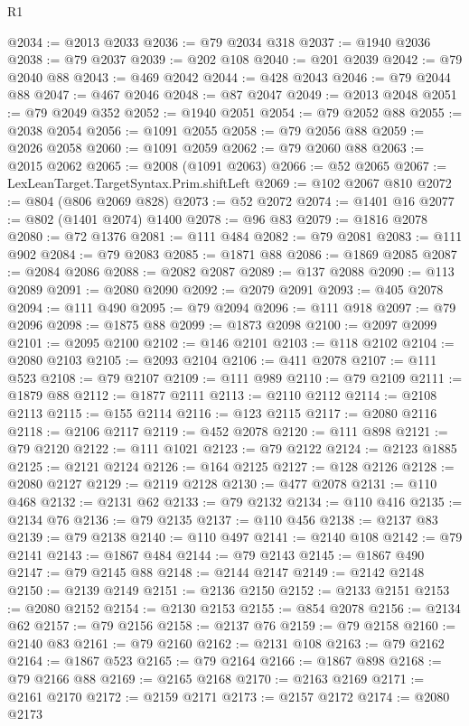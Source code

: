 \begin{lexlean}{R1}
\begin{coremodule}
@2034 := @2013 @2033
@2036 := @79 @2034 @318
@2037 := @1940 @2036
@2038 := @79 @2037
@2039 := @202 @108
@2040 := @201 @2039
@2042 := @79 @2040 @88
@2043 := @469 @2042
@2044 := @428 @2043
@2046 := @79 @2044 @88
@2047 := @467 @2046
@2048 := @87 @2047
@2049 := @2013 @2048
@2051 := @79 @2049 @352
@2052 := @1940 @2051
@2054 := @79 @2052 @88
@2055 := @2038 @2054
@2056 := @1091 @2055
@2058 := @79 @2056 @88
@2059 := @2026 @2058
@2060 := @1091 @2059
@2062 := @79 @2060 @88
@2063 := @2015 @2062
@2065 := @2008 (@1091 @2063)
@2066 := @52 @2065
@2067 := LexLeanTarget.TargetSyntax.Prim.shiftLeft
@2069 := @102 @2067 @810
@2072 := @804 (@806 @2069 @828)
@2073 := @52 @2072
@2074 := @1401 @16
@2077 := @802 (@1401 @2074) @1400
@2078 := @96 @83
@2079 := @1816 @2078
@2080 := @72 @1376
@2081 := @111 @484
@2082 := @79 @2081
@2083 := @111 @902
@2084 := @79 @2083
@2085 := @1871 @88
@2086 := @1869 @2085
@2087 := @2084 @2086
@2088 := @2082 @2087
@2089 := @137 @2088
@2090 := @113 @2089
@2091 := @2080 @2090
@2092 := @2079 @2091
@2093 := @405 @2078
@2094 := @111 @490
@2095 := @79 @2094
@2096 := @111 @918
@2097 := @79 @2096
@2098 := @1875 @88
@2099 := @1873 @2098
@2100 := @2097 @2099
@2101 := @2095 @2100
@2102 := @146 @2101
@2103 := @118 @2102
@2104 := @2080 @2103
@2105 := @2093 @2104
@2106 := @411 @2078
@2107 := @111 @523
@2108 := @79 @2107
@2109 := @111 @989
@2110 := @79 @2109
@2111 := @1879 @88
@2112 := @1877 @2111
@2113 := @2110 @2112
@2114 := @2108 @2113
@2115 := @155 @2114
@2116 := @123 @2115
@2117 := @2080 @2116
@2118 := @2106 @2117
@2119 := @452 @2078
@2120 := @111 @898
@2121 := @79 @2120
@2122 := @111 @1021
@2123 := @79 @2122
@2124 := @2123 @1885
@2125 := @2121 @2124
@2126 := @164 @2125
@2127 := @128 @2126
@2128 := @2080 @2127
@2129 := @2119 @2128
@2130 := @477 @2078
@2131 := @110 @468
@2132 := @2131 @62
@2133 := @79 @2132
@2134 := @110 @416
@2135 := @2134 @76
@2136 := @79 @2135
@2137 := @110 @456
@2138 := @2137 @83
@2139 := @79 @2138
@2140 := @110 @497
@2141 := @2140 @108
@2142 := @79 @2141
@2143 := @1867 @484
@2144 := @79 @2143
@2145 := @1867 @490
@2147 := @79 @2145 @88
@2148 := @2144 @2147
@2149 := @2142 @2148
@2150 := @2139 @2149
@2151 := @2136 @2150
@2152 := @2133 @2151
@2153 := @2080 @2152
@2154 := @2130 @2153
@2155 := @854 @2078
@2156 := @2134 @62
@2157 := @79 @2156
@2158 := @2137 @76
@2159 := @79 @2158
@2160 := @2140 @83
@2161 := @79 @2160
@2162 := @2131 @108
@2163 := @79 @2162
@2164 := @1867 @523
@2165 := @79 @2164
@2166 := @1867 @898
@2168 := @79 @2166 @88
@2169 := @2165 @2168
@2170 := @2163 @2169
@2171 := @2161 @2170
@2172 := @2159 @2171
@2173 := @2157 @2172
@2174 := @2080 @2173

\end{coremodule}
\end{lexlean}
